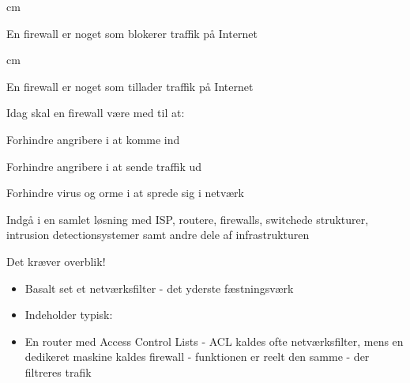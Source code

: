  cm
\centerline{\hlkbig En firewall er noget som {\color{green}blokerer}
  traffik på Internet}  

 cm
\pause

\centerline{\hlkbig En firewall er noget som {\color{red}tillader}
  traffik på Internet}


\begin{list1}
\item Idag skal en firewall være med til at:
\begin{list2}
\item Forhindre angribere i at komme ind
\item Forhindre angribere i at sende traffik ud
\item Forhindre virus og orme i at sprede sig i netværk
\item Indgå i en samlet løsning med ISP, routere, firewalls, switchede
  strukturer, intrusion detectionsystemer samt andre dele af infrastrukturen
\end{list2}
\item Det kræver overblik!
\end{list1}



\begin{itemize}
\item Basalt set et netværksfilter - det yderste fæstningsværk
\item Indeholder typisk:
\item En router med Access Control Lists - ACL kaldes ofte
  netværksfilter, mens en dedikeret maskine kaldes firewall -
  funktionen er reelt den samme - der filtreres trafik
\end{itemize}


